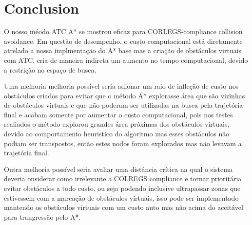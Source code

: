 \chapter{Conclusion}
\label{chap:6_Conclusion}

    O nosso méodo ATC A* se mostrou eficaz para CORLEGS-compliance collision avoidance. Em questão de desempenho, o custo computacional está diretamente atrelado a nossa implmentação do A* base mas a criação de obstáculos virtuais com ATC, cria de maneira indireta um aumento no tempo computacional, devido a restrição no espaço de busca.
    
    Uma melhoria melhoria possível seria adionar um raio de infleção de custo nos obstáculos criados para evitar que o método A* explorasse área que são vizinhas de obstáculos virtuais e que não poderam ser utilizadas na busca pela trajetória final e acabam somente por aumentar o custo computacional, pois nos testes realiados o método explorou grandes área próximas dos obstáculos virtuais, devido ao comportamento heuristico  do algoritmo mas esses obstáculos não podiam ser transpostos, então estes nodos foram explorados mas não levavam a trajetória final.
    
    Outra melhoria possível seria avaliar uma distância crítica na qual o sistema deveria onsiderar como irrelevante a COLREGS compliance e tornar prioritária evitar obstáculos a todo custo, ou seja podendo inclusive ultrapassar zonas que estivessem com a marcação de obstáculos virtuais, isso pode ser implementado mantendo os obstáculos virtuais com um custo auto mas não acima do aceitável para trangressão pelo A*.